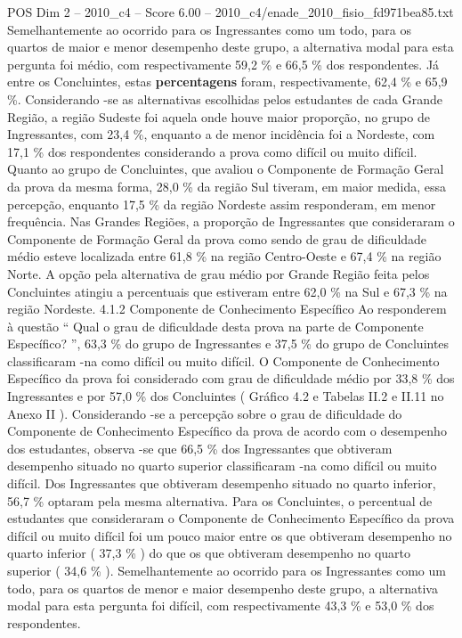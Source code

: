 \begin{textsample}{POS Dim 2 – 2010\_c4 – Score 6.00 – 2010\_c4/enade\_2010\_fisio\_fd971bea85.txt}
Semelhantemente ao ocorrido para os Ingressantes como um todo, para os quartos de maior e menor desempenho deste grupo, a alternativa modal para esta pergunta foi médio, com respectivamente 59,2 \% e 66,5 \% dos respondentes.
Já entre os Concluintes, estas \textbf{percentagens} foram, respectivamente, 62,4 \% e 65,9 \%.
Considerando -se as alternativas escolhidas pelos estudantes de cada Grande Região, a região Sudeste foi aquela onde houve maior proporção, no grupo de Ingressantes, com 23,4 \%, enquanto a de menor incidência foi a Nordeste, com 17,1 \% dos respondentes considerando a prova como difícil ou muito difícil.
Quanto ao grupo de Concluintes, que avaliou o Componente de Formação Geral da prova da mesma forma, 28,0 \% da região Sul tiveram, em maior medida, essa percepção, enquanto 17,5 \% da região Nordeste assim responderam, em menor frequência.
Nas Grandes Regiões, a proporção de Ingressantes que consideraram o Componente de Formação Geral da prova como sendo de grau de dificuldade médio esteve localizada entre 61,8 \% na região Centro-Oeste e 67,4 \% na região Norte.
A opção pela alternativa de grau médio por Grande Região feita pelos Concluintes atingiu a percentuais que estiveram entre 62,0 \% na Sul e 67,3 \% na região Nordeste. 4.1.2 Componente de Conhecimento Específico Ao responderem à questão “ Qual o grau de dificuldade desta prova na parte de Componente Específico? ”, 63,3 \% do grupo de Ingressantes e 37,5 \% do grupo de Concluintes classificaram -na como difícil ou muito difícil.
O Componente de Conhecimento Específico da prova foi considerado com grau de dificuldade médio por 33,8 \% dos Ingressantes e por 57,0 \% dos Concluintes ( Gráfico 4.2 e Tabelas II.2 e II.11 no Anexo II ).
Considerando -se a percepção sobre o grau de dificuldade do Componente de Conhecimento Específico da prova de acordo com o desempenho dos estudantes, observa -se que 66,5 \% dos Ingressantes que obtiveram desempenho situado no quarto superior classificaram -na como difícil ou muito difícil.
Dos Ingressantes que obtiveram desempenho situado no quarto inferior, 56,7 \% optaram pela mesma alternativa.
Para os Concluintes, o percentual de estudantes que consideraram o Componente de Conhecimento Específico da prova difícil ou muito difícil foi um pouco maior entre os que obtiveram desempenho no quarto inferior ( 37,3 \% ) do que os que obtiveram desempenho no quarto superior ( 34,6 \% ).
Semelhantemente ao ocorrido para os Ingressantes como um todo, para os quartos de menor e maior desempenho deste grupo, a alternativa modal para esta pergunta foi difícil, com respectivamente 43,3 \% e 53,0 \% dos respondentes.

\end{textsample}

